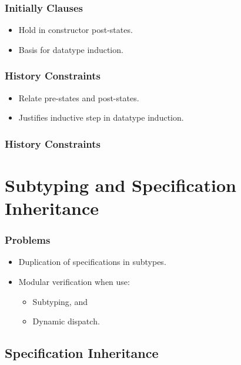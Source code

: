 \begin{frame}[fragile]
\frametitle{Initially Clauses}

\begin{itemize}
\item
Hold in constructor post-states.

\item
Basis for datatype induction.
\end{itemize}



\end{frame}

\begin{frame}
\frametitle{History Constraints}
\begin{itemize}
\item
Relate pre-states and post-states.

\item
Justifies inductive step in datatype induction.
\end{itemize}
\end{frame}

\begin{frame}[fragile]
\frametitle{History Constraints}



\end{frame}

\section[Subtypes]{Subtyping and Specification Inheritance}

\begin{frame}
\frametitle{Problems}
\begin{itemize}
\item
Duplication of specifications in subtypes.

\item
Modular verification when use:
\begin{itemize}
\item
Subtyping, and

\item
Dynamic dispatch.
\end{itemize}
\end{itemize}
\end{frame}

\subsection[Spec. Inh.]{Specification Inheritance}

